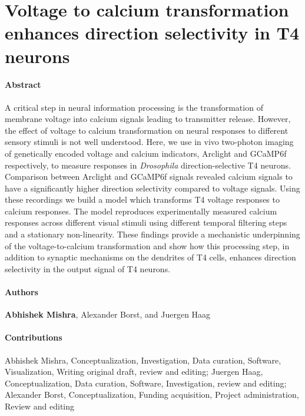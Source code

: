\section{Voltage to calcium transformation enhances direction selectivity in  T4 neurons}
\label{sct:manuscript_mishra_haag}


\paragraph{Abstract}
A critical step in neural information processing is the transformation of membrane voltage into calcium signals leading to transmitter release. However, the effect of voltage to calcium transformation on neural responses to different sensory stimuli is not well understood. Here, we use in vivo two-photon imaging of genetically encoded voltage and calcium indicators, Arclight and GCaMP6f respectively, to measure responses in \textit{Drosophila} direction-selective T4 neurons. Comparison between Arclight and GCaMP6f signals revealed calcium signals to have a significantly higher direction selectivity compared to voltage signals. Using these recordings we build a model which transforms T4 voltage responses to calcium responses. The model reproduces experimentally measured calcium responses across different visual stimuli using different temporal filtering steps and a stationary non-linearity. These findings provide a mechanistic underpinning of the voltage-to-calcium transformation and show how this processing step, in addition to synaptic mechanisms on the dendrites of T4 cells, enhances direction selectivity in the output signal of T4 neurons.


\paragraph{Authors} \textbf{Abhishek Mishra}, Alexander Borst, and Juergen Haag

\paragraph{Contributions}
Abhishek Mishra, Conceptualization, Investigation, Data curation, Software, Visualization, Writing original draft, review and editing; Juergen Haag, Conceptualization, Data curation, Software, Investigation, review and editing; Alexander Borst, Conceptualization, Funding acquisition, Project administration, Review and editing

\cleardoublepage

